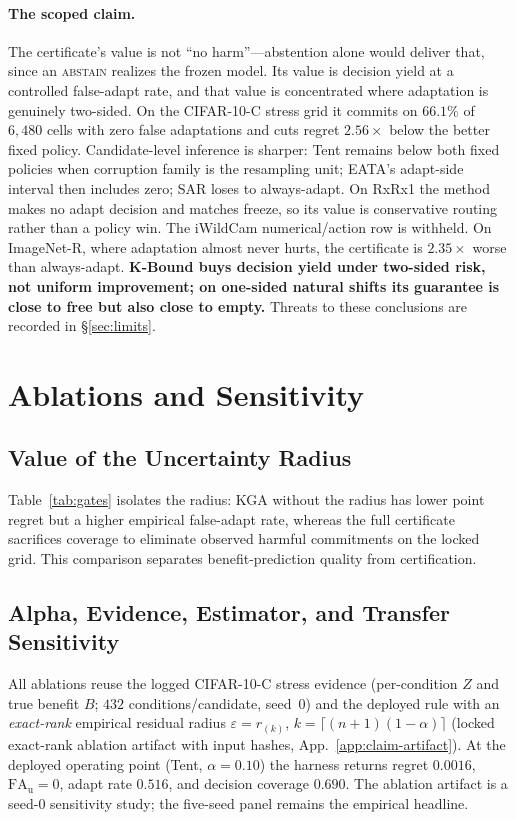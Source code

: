 \paragraph{The scoped claim.} The certificate's value is not ``no harm''---abstention alone would
deliver that, since an \textsc{abstain} realizes the frozen model. Its value is decision yield at a
controlled false-adapt rate, and that value is concentrated where adaptation is genuinely two-sided.
On the CIFAR-10-C stress grid it commits on $66.1\%$ of $6{,}480$ cells with zero false adaptations
and cuts regret $2.56\times$ below the better fixed policy. Candidate-level inference is sharper:
Tent remains below both fixed policies when corruption family is the resampling unit; EATA's
adapt-side interval then includes zero; SAR loses to always-adapt. On RxRx1 the method makes no
adapt decision and matches freeze, so its value is conservative routing rather than a policy win.
The iWildCam numerical/action row is withheld. On ImageNet-R, where adaptation almost never hurts, the certificate is
$2.35\times$ worse than always-adapt. \textbf{K-Bound buys decision yield under two-sided risk, not uniform
improvement; on one-sided natural shifts its guarantee is close to free but also close to empty.}
Threats to these conclusions are recorded in \S\ref{sec:limits}.


\section{Ablations and Sensitivity}\label{sec:ablations}
\subsection{Value of the Uncertainty Radius}
Table~\ref{tab:gates} isolates the radius: KGA without the radius has lower point regret but a higher empirical false-adapt rate, whereas the full certificate sacrifices coverage to eliminate observed harmful commitments on the locked grid. This comparison separates benefit-prediction quality from certification.

\subsection{Alpha, Evidence, Estimator, and Transfer Sensitivity}\label{sec:sens-ablations}
All ablations reuse the logged CIFAR-10-C stress evidence (per-condition $Z$ and true benefit $B$;
$432$ conditions/candidate, seed~0) and the deployed rule with an \emph{exact-rank} empirical residual radius
$\varepsilon=r_{(k)}$, $k=\lceil(n{+}1)(1-\alpha)\rceil$ (locked exact-rank ablation artifact with
input hashes, App.~\ref{app:claim-artifact}). At the deployed operating
point (Tent, $\alpha{=}0.10$) the harness returns regret $0.0016$,
$\mathrm{FA}_{\mathrm u}{=}0$, adapt rate $0.516$, and decision coverage $0.690$. The
ablation artifact is a seed-0 sensitivity study; the five-seed panel remains the empirical headline.

